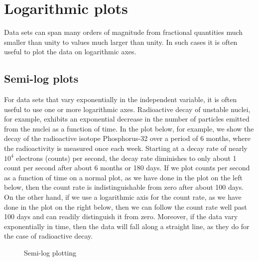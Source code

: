 \documentclass[letterpaper,10pt,english]{sphinxmanual}
\begin{document}
\section{Logarithmic plots}
\label{chap5/chap5_plot:logarithmic-plots}
Data sets can span many orders of magnitude from fractional quantities much smaller than unity to values much larger than unity.  In such cases it is often useful to plot the data on logarithmic axes.


\subsection{Semi-log plots}
\label{chap5/chap5_plot:semi-log-plots}
For data sets that vary exponentially in the independent variable, it is often useful to use one or more logarithmic axes.  Radioactive decay of unstable nuclei, for example, exhibits an exponential decrease in the number of particles emitted from the nuclei as a function of time.  In the plot below, for example, we show the decay of the radioactive isotope Phosphorus-32 over a period of 6 months, where the radioactivity is measured once each week.  Starting at a decay rate of nearly $10^4$ electrons (counts) per second, the decay rate diminishes to only about 1 count per second after about 6 months or 180 days.  If we plot counts per second as a function of time on a normal plot, as we have done in the plot on the left below, then the count rate is indistinguishable from zero after about 100 days.  On the other hand, if we use a logarithmic axis for the count rate, as we have done in the plot on the right below, then we can follow the count rate well past 100 days and can readily distinguish it from zero.  Moreover, if the data vary exponentially in time, then the data will fall along a straight line, as they do for the case of radioactive decay.
\begin{figure}[htbp]
\centering
\capstart

\caption{Semi-log plotting}\label{chap5/chap5_plot:fig-semilogdemo}\end{figure}
\end{document}
